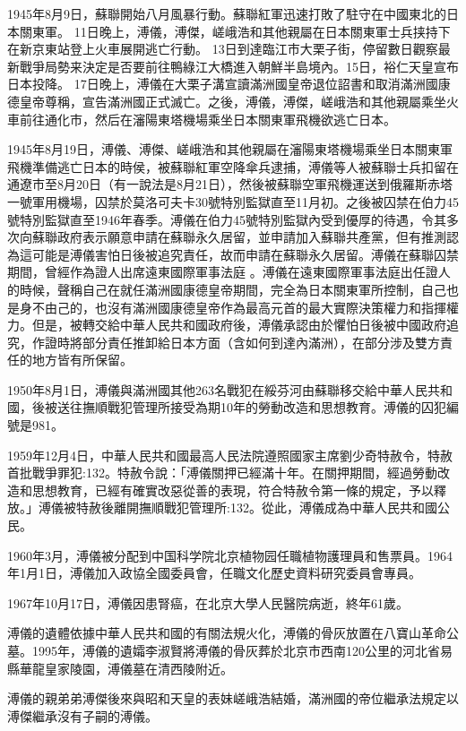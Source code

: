 1945年8月9日，蘇聯開始八月風暴行動。蘇聯紅軍迅速打敗了駐守在中國東北的日本關東軍。 11日晚上，溥儀，溥傑，嵯峨浩和其他親屬在日本關東軍士兵挟持下在新京東站登上火車展開逃亡行動。 13日到達臨江市大栗子街，停留數日觀察最新戰爭局勢来決定是否要前往鴨綠江大橋進入朝鮮半島境內。15日，裕仁天皇宣布日本投降。 17日晚上，溥儀在大栗子溝宣讀滿洲國皇帝退位詔書和取消滿洲國康德皇帝尊稱，宣告滿洲國正式滅亡。之後，溥儀，溥傑，嵯峨浩和其他親屬乘坐火車前往通化市，然后在瀋陽東塔機場乘坐日本關東軍飛機欲逃亡日本。

1945年8月19日，溥儀、溥傑、嵯峨浩和其他親屬在瀋陽東塔機場乘坐日本關東軍飛機準備逃亡日本的時侯，被蘇聯紅軍空降傘兵逮捕，溥儀等人被蘇聯士兵扣留在通遼市至8月20日（有一說法是8月21日），然後被蘇聯空軍飛機運送到俄羅斯赤塔一號軍用機場，囚禁於莫洛可夫卡30號特別監獄直至11月初。之後被囚禁在伯力45號特別監獄直至1946年春季。溥儀在伯力45號特別監獄內受到優厚的待遇，令其多次向蘇聯政府表示願意申請在蘇聯永久居留，並申請加入蘇聯共產黨，但有推測認為這可能是溥儀害怕日後被追究責任，故而申請在蘇聯永久居留。溥儀在蘇聯囚禁期間，曾經作為證人出席遠東國際軍事法庭 。溥儀在遠東國際軍事法庭出任證人的時候，聲稱自己在就任滿洲國康德皇帝期間，完全為日本關東軍所控制，自己也是身不由己的，也沒有滿洲國康德皇帝作為最高元首的最大實際決策權力和指揮權力。但是，被轉交給中華人民共和國政府後，溥儀承認由於懼怕日後被中國政府追究，作證時將部分責任推卸給日本方面（含如何到達內滿洲），在部分涉及雙方責任的地方皆有所保留。

1950年8月1日，溥儀與滿洲國其他263名戰犯在綏芬河由蘇聯移交給中華人民共和國，後被送往撫順戰犯管理所接受為期10年的勞動改造和思想教育。溥儀的囚犯編號是981。

1959年12月4日，中華人民共和國最高人民法院遵照國家主席劉少奇特赦令，特赦首批戰爭罪犯:132。特赦令說：「溥儀關押已經滿十年。在關押期間，經過勞動改造和思想教育，已經有確實改惡從善的表現，符合特赦令第一條的規定，予以釋放。」溥儀被特赦後離開撫順戰犯管理所:132。從此，溥儀成為中華人民共和國公民。

1960年3月，溥儀被分配到中国科学院北京植物园任職植物護理員和售票員。1964年1月1日，溥儀加入政協全國委員會，任職文化歷史資料研究委員會專員。

1967年10月17日，溥儀因患腎癌，在北京大學人民醫院病逝，終年61歲。

溥儀的遺體依據中華人民共和國的有關法規火化，溥儀的骨灰放置在八寶山革命公墓。1995年，溥儀的遺孀李淑賢將溥儀的骨灰葬於北京市西南120公里的河北省易縣華龍皇家陵園，溥儀墓在清西陵附近。

溥儀的親弟弟溥傑後來與昭和天皇的表妹嵯峨浩結婚，滿洲國的帝位繼承法規定以溥傑繼承沒有子嗣的溥儀。

